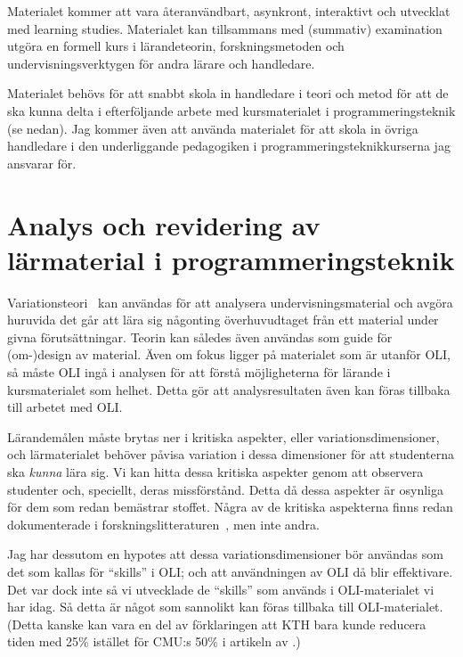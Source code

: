 \documentclass[a4paper,swedish]{article}
\begin{document}
Materialet kommer att vara återanvändbart, asynkront, interaktivt och utvecklat 
med learning studies. Materialet kan tillsammans med (summativ) examination 
utgöra en formell kurs i lärandeteorin, forskningsmetoden och 
undervisningsverktygen för andra lärare och handledare.

Materialet behövs för att snabbt skola in handledare i teori och metod för att 
de ska kunna delta i efterföljande arbete med kursmaterialet i 
programmeringsteknik (se nedan). Jag kommer även att använda materialet för att 
skola in övriga handledare i den underliggande pedagogiken i 
programmeringsteknikkurserna jag ansvarar för.


\section{Analys och revidering av lärmaterial i programmeringsteknik}%
\label{analys}

Variationsteori~\parencite[kap.~3]{NecessaryConditionsOfLearning} kan användas 
för att analysera undervisningsmaterial och avgöra huruvida det går att lära 
sig någonting överhuvudtaget från ett material under givna förutsättningar. 
Teorin kan således även användas som guide för (om-)design av material.
Även om fokus ligger på materialet som är utanför OLI, så måste OLI ingå i 
analysen för att förstå möjligheterna för lärande i kursmaterialet som helhet. 
Detta gör att analysresultaten även kan föras tillbaka till arbetet med OLI.

Lärandemålen måste brytas ner i kritiska aspekter, eller variationsdimensioner, 
och lärmaterialet behöver påvisa variation i dessa dimensioner för att 
studenterna ska \emph{kunna} lära sig.
Vi kan hitta dessa kritiska aspekter genom att observera studenter och, 
speciellt, deras missförstånd.
Detta då dessa aspekter är osynliga för dem som redan bemästrar stoffet.
Några av de kritiska aspekterna finns redan dokumenterade i 
forskningslitteraturen~\parencite[exempelvis][]{VariationTheoryInProgramming}, 
men inte andra.

Jag har dessutom en hypotes att dessa variationsdimensioner bör användas som 
det som kallas för \enquote{skills} i OLI; och att användningen av OLI då blir 
effektivare.
Det var dock inte så vi utvecklade de \enquote{skills} som används i 
OLI-materialet vi har idag.
Så detta är något som sannolikt kan föras tillbaka till OLI-materialet.
(Detta kanske kan vara en del av förklaringen att KTH bara kunde reducera tiden 
med 25\% istället för CMU:s 50\% i artikeln av \cite{ReducedLearningTimeKTH}.)
\end{document}
